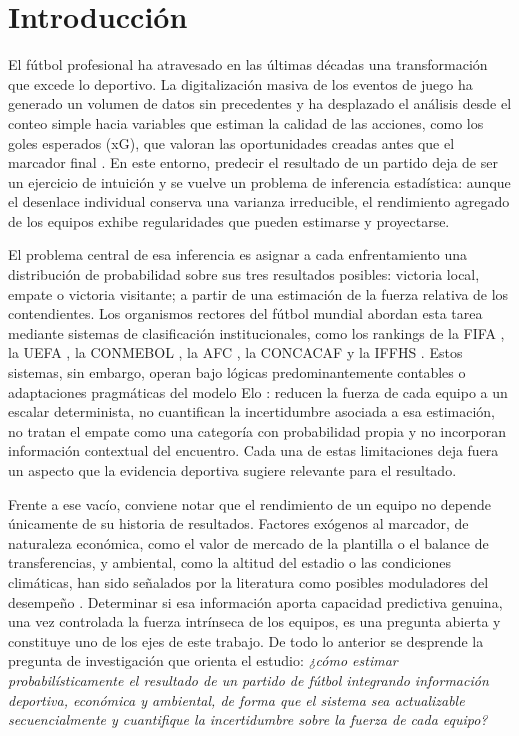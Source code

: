 \chapter*{Introducci\'on}

El f\'utbol profesional ha atravesado en las \'ultimas d\'ecadas una transformaci\'on que excede lo deportivo. La digitalizaci\'on masiva de los eventos de juego ha generado un volumen de datos sin precedentes y ha desplazado el an\'alisis desde el conteo simple hacia variables que estiman la calidad de las acciones, como los goles esperados (xG), que valoran las oportunidades creadas antes que el marcador final \cite{xG,MetricasBase,BigData}. En este entorno, predecir el resultado de un partido deja de ser un ejercicio de intuici\'on y se vuelve un problema de inferencia estad\'istica: aunque el desenlace individual conserva una varianza irreducible, el rendimiento agregado de los equipos exhibe regularidades que pueden estimarse y proyectarse.

El problema central de esa inferencia es asignar a cada enfrentamiento una distribuci\'on de probabilidad sobre sus tres resultados posibles: victoria local, empate o victoria visitante; a partir de una estimaci\'on de la fuerza relativa de los contendientes. Los organismos rectores del f\'utbol mundial abordan esta tarea mediante sistemas de clasificaci\'on institucionales, como los rankings de la FIFA \cite{FIFARanking2024}, la UEFA \cite{UEFARanking2024}, la CONMEBOL \cite{CONMEBOLRanking2021}, la AFC \cite{AFCRanking2024}, la CONCACAF \cite{CONCACAFRanking2023} y la IFFHS \cite{IFFHSRanking2021}. Estos sistemas, sin embargo, operan bajo l\'ogicas predominantemente contables o adaptaciones pragm\'aticas del modelo Elo \cite{Elo1978}: reducen la fuerza de cada equipo a un escalar determinista, no cuantifican la incertidumbre asociada a esa estimaci\'on, no tratan el empate como una categor\'ia con probabilidad propia y no incorporan informaci\'on contextual del encuentro. Cada una de estas limitaciones deja fuera un aspecto que la evidencia deportiva sugiere relevante para el resultado.

Frente a ese vac\'io, conviene notar que el rendimiento de un equipo no depende \'unicamente de su historia de resultados. Factores ex\'ogenos al marcador, de naturaleza econ\'omica, como el valor de mercado de la plantilla o el balance de transferencias, y ambiental, como la altitud del estadio o las condiciones clim\'aticas, han sido se\~nalados por la literatura como posibles moduladores del desempe\~no \cite{SZYMAN1,Iskandaryan2020,West1996}. Determinar si esa informaci\'on aporta capacidad predictiva genuina, una vez controlada la fuerza intr\'inseca de los equipos, es una pregunta abierta y constituye uno de los ejes de este trabajo. De todo lo anterior se desprende la pregunta de investigaci\'on que orienta el estudio: \emph{¿c\'omo estimar probabil\'isticamente el resultado de un partido de f\'utbol integrando informaci\'on deportiva, econ\'omica y ambiental, de forma que el sistema sea actualizable secuencialmente y cuantifique la incertidumbre sobre la fuerza de cada equipo?}

